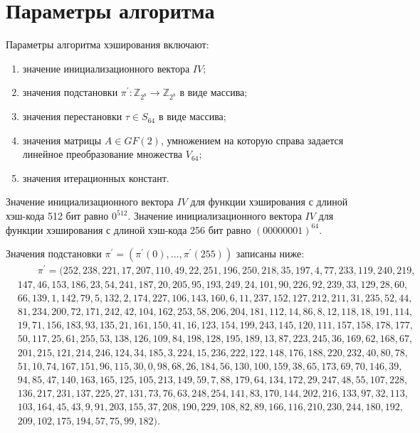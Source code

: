 \section{Параметры алгоритма}
\par
Параметры алгоритма хэширования включают:
\begin{enumerate}
	\item значение инициализационного вектора $IV$;
	\item значения подстановки $\pi^{'} \colon \mathbb{Z}_{2^8} \to \mathbb{Z}_{2^8}$ в виде массива;
	\item значения перестановки $\tau \in S_{64}$ в виде массива;
	\item значения матрицы $A \in GF(2)$, умножением на которую справа задается линейное преобразование множества $V_{64}$;
	\item значения итерационных констант.
\end{enumerate}
\par
Значение инициализационного вектора $IV$ для функции хэширования с длиной хэш-кода 512 бит равно $0^{512}$. Значение инициализационного вектора $IV$ для функции хэширования с длиной хэш-кода 256 бит равно $(00000001)^{64}$.
\par
Значения подстановки $\pi^{'}=(\pi^{'}(0),\dots ,\pi^{'}(255))$ записаны ниже:
\begin{equation}\label{sa}
	\begin{split}
		&\qquad \pi^{'}=(252, 238, 221, 17, 207, 110, 49, 22, 251, 196, 250, 218, 35, 197, 4, 77, 233, 119, 240, 219,\\ &147, 46, 153, 186, 23, 54, 241, 187, 20, 205, 95, 193, 249, 24, 101, 90, 226, 92, 239, 33, 129, 28, 60,\\ &66, 139, 1, 142, 79, 5, 132, 2, 174, 227, 106, 143, 160, 6, 11, 237, 152, 127, 212, 211, 31, 235, 52, 44,\\ &81, 234, 200, 72, 171, 242, 42, 104, 162, 253, 58, 206, 204, 181, 112, 14, 86, 8, 12, 118, 18, 191, 114,\\ &19, 71, 156, 183, 93, 135, 21, 161, 150, 41, 16, 123, 154, 199, 243, 145, 120, 111, 157, 158, 178, 177,\\ &50, 117, 25, 61, 255, 53, 138, 126, 109, 84, 198, 128, 195, 189, 13, 87, 223, 245, 36, 169, 62, 168, 67,\\ &201, 215, 121, 214, 246, 124, 34, 185, 3, 224, 15, 236, 222, 122, 148, 176, 188, 220, 232, 40, 80, 78,\\ &51, 10, 74, 167, 151, 96, 115, 30, 0, 98, 68, 26, 184, 56, 130, 100, 159, 38, 65, 173, 69, 70, 146, 39,\\ &94, 85, 47, 140, 163, 165, 125, 105, 213, 149, 59, 7, 88, 179, 64, 134, 172, 29, 247, 48, 55, 107, 228,\\ &136, 217, 231, 137, 225, 27, 131, 73, 76, 63, 248, 254, 141, 83, 170, 144, 202, 216, 133, 97, 32, 113,\\ &103, 164, 45, 43, 9, 91, 203, 155, 37, 208, 190, 229, 108, 82, 89, 166, 116, 210, 230, 244, 180, 192,\\ &209, 102, 175, 194, 57, 75, 99, 182).
	\end{split}
\end{equation}
